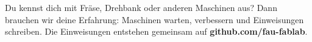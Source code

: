 Du kennst dich mit Fräse, Drehbank oder anderen Maschinen aus? Dann
brauchen wir deine Erfahrung: Maschinen warten, verbessern und
Einweisungen schreiben. Die Einweisungen entstehen gemeinsam auf
\textbf{github.com/fau-fablab}.
